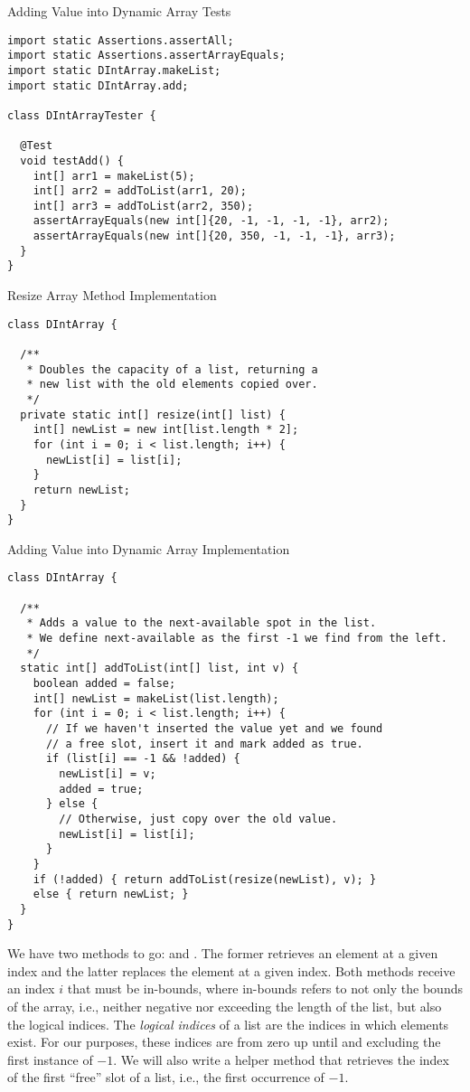 \begin{cl}[]{Adding Value into Dynamic Array Tests}
\begin{lstlisting}[language=MyJava]
import static Assertions.assertAll;
import static Assertions.assertArrayEquals;
import static DIntArray.makeList;
import static DIntArray.add;

class DIntArrayTester {

  @Test
  void testAdd() {
    int[] arr1 = makeList(5);
    int[] arr2 = addToList(arr1, 20);
    int[] arr3 = addToList(arr2, 350);
    assertArrayEquals(new int[]{20, -1, -1, -1, -1}, arr2);
    assertArrayEquals(new int[]{20, 350, -1, -1, -1}, arr3);
  }
}
\end{lstlisting}
\end{cl}

\begin{cl}[]{Resize Array Method Implementation}
\begin{lstlisting}[language=MyJava]
class DIntArray {

  /**
   * Doubles the capacity of a list, returning a 
   * new list with the old elements copied over.
   */
  private static int[] resize(int[] list) {
    int[] newList = new int[list.length * 2];
    for (int i = 0; i < list.length; i++) {
      newList[i] = list[i];
    }
    return newList;
  }
}
\end{lstlisting}
\end{cl}

\begin{cl}[]{Adding Value into Dynamic Array Implementation}
\begin{lstlisting}[language=MyJava]
class DIntArray {

  /**
   * Adds a value to the next-available spot in the list.
   * We define next-available as the first -1 we find from the left.
   */
  static int[] addToList(int[] list, int v) {
    boolean added = false;
    int[] newList = makeList(list.length);
    for (int i = 0; i < list.length; i++) {
      // If we haven't inserted the value yet and we found
      // a free slot, insert it and mark added as true.
      if (list[i] == -1 && !added) {
        newList[i] = v;
        added = true;
      } else {
        // Otherwise, just copy over the old value.
        newList[i] = list[i];
      }
    }
    if (!added) { return addToList(resize(newList), v); } 
    else { return newList; }
  }
}
\end{lstlisting}
\end{cl}

We have two methods to go:  and . The former retrieves an element at a given index and the latter replaces the element at a given index. Both methods receive an index $i$ that must be in-bounds, where in-bounds refers to not only the bounds of the array, i.e., neither negative nor exceeding the length of the list, but also the logical indices. The \emph{logical indices} of a list are the indices in which elements exist. For our purposes, these indices are from zero up until and excluding the first instance of $-1$. We will also write a helper method that retrieves the index of the first ``free'' slot of a list, i.e., the first occurrence of $-1$.

